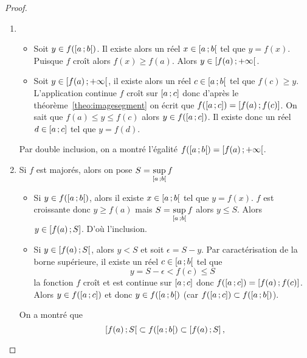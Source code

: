 \begin{proof}
  \begin{enumerate}
  \item
    \begin{itemize}
    \item Soit \(y \in f(\left[ a \, ;  b \right[)\). Il existe alors un réel \(x \in \left[ a \, ;  b \right[\) tel que \(y=f(x)\). Puisque \(f\) croît alors \(f(x) \geqslant f(a)\). Alors \(y \in \left[ f(a) \, ;  +\infty \right[\).
    \item Soit \(y \in \left[ f(a) \, ;  +\infty \right[\), il existe alors un réel \(c \in \left[ a \, ;  b \right[\) tel que \(f(c) \geqslant y\). L'application continue \(f\) croît sur \(\left[ a \, ;  c \right]\) donc d'après le théorème~\ref{theo:imagesegment} on écrit que \(f(\left[ a \, ;  c \right])=\left[ f(a) \, ;  f(c) \right]\). On sait que \(f(a) \le y \leqslant f(c)\) alors \(y \in f(\left[ a \, ;  c \right])\). Il existe donc un réel \(d \in \left[ a \, ;  c \right]\) tel que \(y=f(d)\).
    \end{itemize}
    Par double inclusion, on a montré l'égalité \(f(\left[ a \, ;  b \right[)=\left[ f(a) \, ;  +\infty \right[\).
  \item Si \(f\) est majorés, alors on pose \(S=\sup\limits_{\left[ a \, ;  b \right[}f\)
    \begin{itemize}
    \item Si \(y \in f(\left[ a \, ;  b \right[)\), alors il existe \(x \in \left[ a \, ;  b \right[\) tel que \(y=f(x)\). \(f\) est croissante donc \(y \geqslant f(a)\) mais \(S=\sup\limits_{\left[ a \, ;  b \right[}f\) alors \(y \leqslant S\). Alors \(y \in \left[ f(a) \, ;  S \right]\). D'où l'inclusion.
    \item Si \(y \in \left[ f(a) \, ;  S \right[\), alors \(y < S\) et soit \(\epsilon=S-y\). Par caractérisation de la borne supérieure, il existe un réel \(c \in \left[ a \, ;  b \right[\) tel que
      \begin{equation}
        y=S-\epsilon < f(c) \leqslant S
      \end{equation}
      la fonction \(f\) croît et est continue sur \(\left[ a \, ;  c \right]\) donc \(f(\left[ a \, ;  c \right])=\left[ f(a) \, ;  f(c) \right]\). Alors \(y \in f(\left[ a \, ;  c \right])\) et donc \(y \in f(\left[ a \, ;  b \right[)\) (car \(f(\left[ a \, ;  c \right]) \subset f(\left[ a \, ;  b \right[)\)).
    \end{itemize}
    On a montré que
    \begin{equation}
      \left[ f(a) \, ;  S \right[ \subset f(\left[ a \, ;  b \right[) \subset \left[ f(a) \, ;  S \right],
    \end{equation}

\end{enumerate}
\end{proof}
